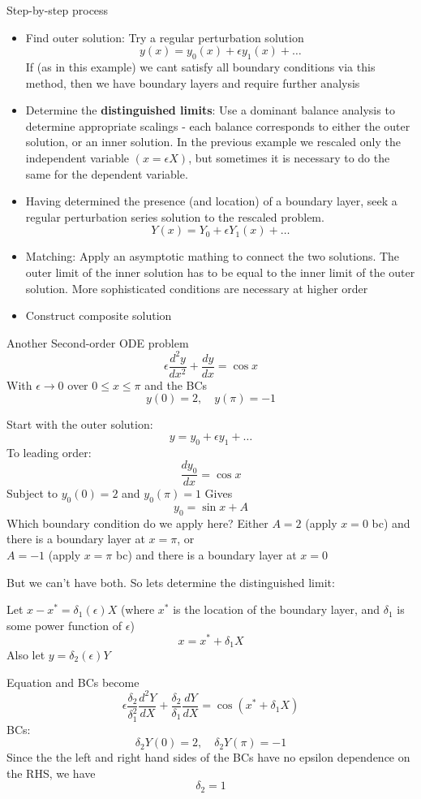 \documentclass{/home/janmebows/Documents/LatexTemplates/myassignment}
\begin{document}
Step-by-step process
\begin{itemize}
    \item Find outer solution:
    Try a regular perturbation solution
    \[y(x) = y_0(x) + \epsilon y_1(x) + \ldots\]
    If (as in this example) we cant satisfy all boundary conditions via this method, then we have boundary layers and require further analysis
    \item Determine the \textbf{distinguished limits}: Use a dominant balance analysis to determine appropriate scalings - each balance corresponds to either the outer solution, or an inner solution. In the previous example we rescaled only the independent variable $(x = \epsilon X)$, but sometimes it is necessary to do the same for the dependent variable.
    \item Having determined the presence (and location) of a boundary layer, seek a regular perturbation series solution to the rescaled problem. 
    \[Y(x) = Y_0 + \epsilon Y_1(x) + \ldots\]
    \item Matching: Apply an asymptotic mathing to connect the two solutions. The outer limit of the inner solution has to be equal to the inner limit of the outer solution. More sophisticated conditions are necessary at higher order
    \item Construct composite solution
\end{itemize}

Another Second-order ODE problem
\[\epsilon \frac{d^2y}{dx^2} + \frac{dy}{dx} = \cos x\]
With $\epsilon \to 0$ over $0\leq x \leq \pi$ and the BCs
\[y(0) = 2, \quad y(\pi) = -1\]

Start with the outer solution:
\[y = y_0 + \epsilon y_1 + \ldots\]
To leading order:
\[\frac{dy_0}{dx} = \cos x\]
Subject to $y_0(0) = 2$ and $y_0(\pi) = 1$
Gives
\[y_0 = \sin x + A\]
Which boundary condition do we apply here?
Either $A = 2$ (apply $x=0$ bc) and there is a boundary layer at $x=\pi$, or\\
$A = -1$ (apply $x=\pi$ bc) and there is a boundary layer at $x = 0$

But we can't have both. So lets determine the distinguished limit:

Let $x - x^* = \delta_1(\epsilon) X$ (where $x^*$ is the location of the boundary layer, and $\delta_1$ is some power function of $\epsilon$) 
\[x = x^* + \delta_1 X\]
Also let $y = \delta_2(\epsilon)Y$

Equation and BCs become
\[\epsilon \frac{\delta_2}{\delta_1^2} \frac{d^2 Y}{dX} + \frac{\delta_2}{\delta_1} \frac{dY}{dX} = \cos(x^* + \delta_1 X)\]
BCs:
\[\delta_2 Y(0) = 2,\quad \delta_2 Y(\pi) = -1\]
Since the the left and right hand sides of the BCs have no epsilon dependence on the RHS, we have
\[\delta_2 = 1\]
\end{document}
